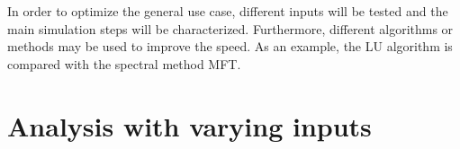 \documentclass[a4paper]{report}
\begin{document}
In order to optimize the general use case, different inputs will be tested and 
the main simulation steps will be characterized. Furthermore, different 
algorithms or methods may be used to improve the speed. As an example, the LU 
algorithm is compared with the spectral method MFT.

\section{Analysis with varying inputs}



%
%

%
%
\end{document}
